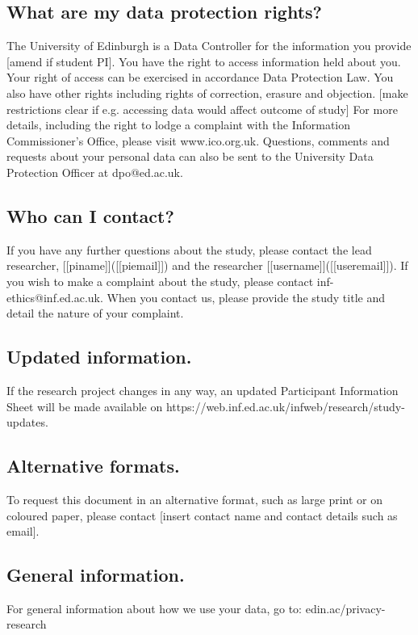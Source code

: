 \documentclass{article}
\begin{document}
\subsection*{What are my data protection rights?}
The University of Edinburgh is a Data Controller for the information you provide [amend if student PI].  You have the right to access information held about you. Your right of access can be exercised in accordance Data Protection Law. You also have other rights including rights of correction, erasure and objection. [make restrictions clear if e.g. accessing data would affect outcome of study] For more details, including the right to lodge a complaint with the Information Commissioner’s Office, please visit www.ico.org.uk. Questions, comments and requests about your personal data can also be sent to the University Data Protection Officer at dpo@ed.ac.uk. 
\subsection*{Who can I contact?}
If you have any further questions about the study, please contact the lead researcher, [[piname]]([[piemail]]) and the researcher [[username]]([[useremail]]). 
If you wish to make a complaint about the study, please contact 
inf-ethics@inf.ed.ac.uk. When you contact us, please provide the study title and detail the nature of your complaint.
\subsection*{Updated information.}
If the research project changes in any way, an updated Participant Information Sheet will be made available on https://web.inf.ed.ac.uk/infweb/research/study-updates. 
\subsection*{Alternative formats.}
To request this document in an alternative format, such as large print or on coloured paper, please contact [insert contact name and contact details such as email].
\subsection*{General information.}
For general information about how we use your data, go to: edin.ac/privacy-research
\end{document}
